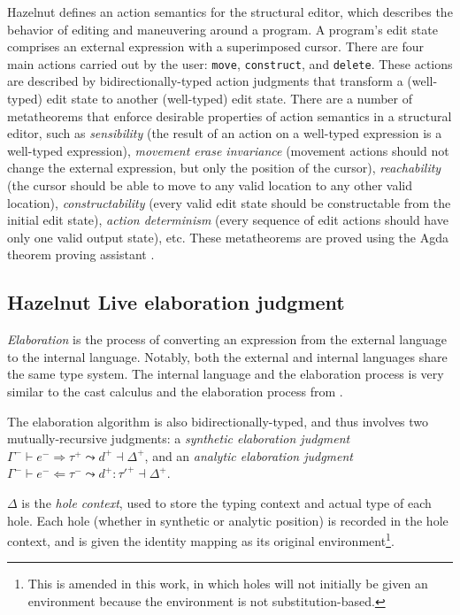 Hazelnut defines an action semantics for the structural editor, which describes the behavior of editing and maneuvering around a program. A program's edit state comprises an external expression with a superimposed cursor. There are four main actions carried out by the user: \texttt{move}, \texttt{construct}, and \texttt{delete}. These actions are described by bidirectionally-typed action judgments that transform a (well-typed) edit state to another (well-typed) edit state. There are a number of metatheorems that enforce desirable properties of action semantics in a structural editor, such as \textit{sensibility} (the result of an action on a well-typed expression is a well-typed expression), \textit{movement erase invariance} (movement actions should not change the external expression, but only the position of the cursor), \textit{reachability} (the cursor should be able to move to any valid location to any other valid location), \textit{constructability} (every valid edit state should be constructable from the initial edit state), \textit{action determinism} (every sequence of edit actions should have only one valid output state), etc. These metatheorems are proved using the Agda theorem proving assistant \cite{agda2017}.


\subsection{Hazelnut Live elaboration judgment}
\label{sec:hazel-elaboration}

\textit{Elaboration} is the process of converting an expression from the external language to the internal language. Notably, both the external and internal languages share the same type system. The internal language and the elaboration process is very similar to the cast calculus \gtclc and the elaboration process from \gtlc.

The elaboration algorithm is also bidirectionally-typed, and thus involves two mutually-recursive judgments: a \textit{synthetic elaboration judgment} $\Gamma^-\vdash e^-\Rightarrow\tau^+\leadsto d^+\dashv\Delta^+$, and an \textit{analytic elaboration judgment} $\Gamma^-\vdash e^-\Leftarrow\tau^-\leadsto d^+:\tau'^+\dashv\Delta^+$.

$\Delta$ is the \textit{hole context}, used to store the typing context and actual type of each hole. Each hole (whether in synthetic or analytic position) is recorded in the hole context, and is given the identity mapping as its original environment\footnote{This is amended in this work, in which holes will not initially be given an environment because the environment is not substitution-based.}.

